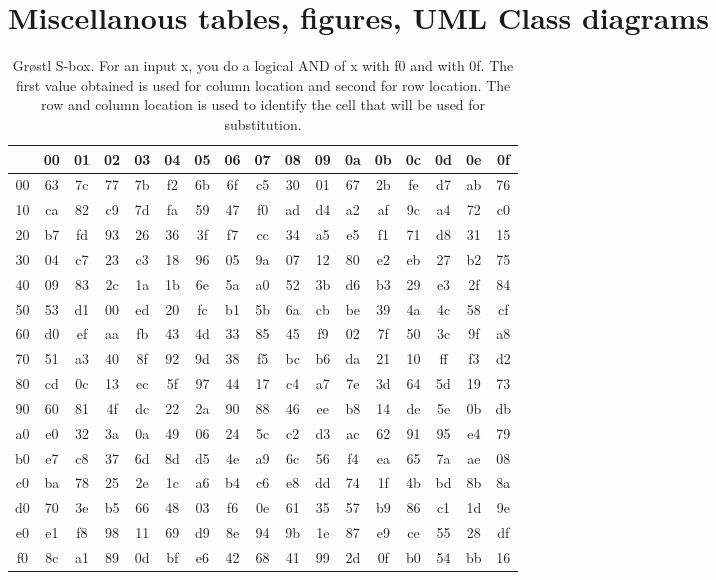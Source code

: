 \chapter{Miscellanous tables, figures, UML Class diagrams}

\begin{table}[h]
\begin{center}
  \begin{tabular}{ c | *{16}{c}}
     & 00 & 01 & 02 & 03 & 04 & 05 & 06 & 07 & 08 & 09 & 0a & 0b & 0c & 0d & 0e & 0f \\ \hline
  00 & 63 & 7c & 77 & 7b & f2 & 6b & 6f & c5 & 30 & 01 & 67 & 2b & fe & d7 & ab & 76 \\ 
  10 & ca & 82 & c9 & 7d & fa & 59 & 47 & f0 & ad & d4 & a2 & af & 9c & a4 & 72 & c0 \\
  20 & b7 & fd & 93 & 26 & 36 & 3f & f7 & cc & 34 & a5 & e5 & f1 & 71 & d8 & 31 & 15 \\
  30 & 04 & c7 & 23 & c3 & 18 & 96 & 05 & 9a & 07 & 12 & 80 & e2 & eb & 27 & b2 & 75 \\
  40 & 09 & 83 & 2c & 1a & 1b & 6e & 5a & a0 & 52 & 3b & d6 & b3 & 29 & e3 & 2f & 84 \\
  50 & 53 & d1 & 00 & ed & 20 & fc & b1 & 5b & 6a & cb & be & 39 & 4a & 4c & 58 & cf \\
  60 & d0 & ef & aa & fb & 43 & 4d & 33 & 85 & 45 & f9 & 02 & 7f & 50 & 3c & 9f & a8 \\
  70 & 51 & a3 & 40 & 8f & 92 & 9d & 38 & f5 & bc & b6 & da & 21 & 10 & ff & f3 & d2 \\
  80 & cd & 0c & 13 & ec & 5f & 97 & 44 & 17 & c4 & a7 & 7e & 3d & 64 & 5d & 19 & 73 \\
  90 & 60 & 81 & 4f & dc & 22 & 2a & 90 & 88 & 46 & ee & b8 & 14 & de & 5e & 0b & db \\
  a0 & e0 & 32 & 3a & 0a & 49 & 06 & 24 & 5c & c2 & d3 & ac & 62 & 91 & 95 & e4 & 79 \\
  b0 & e7 & c8 & 37 & 6d & 8d & d5 & 4e & a9 & 6c & 56 & f4 & ea & 65 & 7a & ae & 08 \\
  c0 & ba & 78 & 25 & 2e & 1c & a6 & b4 & c6 & e8 & dd & 74 & 1f & 4b & bd & 8b & 8a \\
  d0 & 70 & 3e & b5 & 66 & 48 & 03 & f6 & 0e & 61 & 35 & 57 & b9 & 86 & c1 & 1d & 9e \\
  e0 & e1 & f8 & 98 & 11 & 69 & d9 & 8e & 94 & 9b & 1e & 87 & e9 & ce & 55 & 28 & df \\
  f0 & 8c & a1 & 89 & 0d & bf & e6 & 42 & 68 & 41 & 99 & 2d & 0f & b0 & 54 & bb & 16 \\
  \end{tabular}
  \caption{Gr{\o}stl S-box. For an input x, you do a logical AND of x with f0 and with 0f.
  The first value obtained is used for column location and second for row location. The
  row and column location is used to identify the cell that will be used for substitution.
  \cite{00019}}
  \label{table:Groestlsbox}
\end{center}
\end{table}

